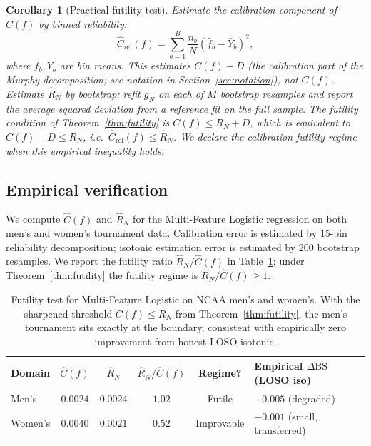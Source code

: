 \documentclass[11pt,a4paper]{article}
\newtheorem{corollary}[theorem]{Corollary}
\theoremstyle{definition}
\newcommand{\BS}{\mathrm{BS}}
\begin{document}
\begin{corollary}[Practical futility test]\label{cor:futility-test}
Estimate the calibration component of $C(f)$ by binned reliability:
\[
\hat{C}_{\text{rel}}(f) = \sum_{b=1}^{B} \frac{n_b}{N} (\bar{f}_b - \bar{Y}_b)^2,
\]
where $\bar{f}_b, \bar{Y}_b$ are bin means. This estimates $C(f) - D$ (the calibration part of the Murphy decomposition; see notation in Section~\ref{sec:notation}), not $C(f)$. Estimate $\hat{R}_N$ by bootstrap: refit $g_N$ on each of $M$ bootstrap resamples and report the average squared deviation from a reference fit on the full sample. The futility condition of Theorem~\ref{thm:futility} is $C(f) \le R_N + D$, which is equivalent to $C(f) - D \le R_N$, i.e.\ $\hat{C}_{\text{rel}}(f) \le \hat{R}_N$. We declare the calibration-futility regime when this empirical inequality holds.
\end{corollary}

\subsection{Empirical verification}\label{sec:cal-empirical}

We compute $\hat{C}(f)$ and $\hat{R}_N$ for the Multi-Feature Logistic regression on both men's and women's tournament data. Calibration error is estimated by 15-bin reliability decomposition; isotonic estimation error is estimated by 200 bootstrap resamples. We report the futility ratio $\hat{R}_N / \hat{C}(f)$ in Table~\ref{tab:futility}; under Theorem~\ref{thm:futility} the futility regime is $\hat{R}_N / \hat{C}(f) \ge 1$.

\begin{table}[h]
\centering
\caption{Futility test for Multi-Feature Logistic on NCAA men's and women's. With the sharpened threshold $C(f) \le R_N$ from Theorem~\ref{thm:futility}, the men's tournament sits exactly at the boundary, consistent with empirically zero improvement from honest LOSO isotonic.}
\label{tab:futility}
\small
\begin{tabular}{@{}lccccl@{}}
\toprule
Domain & $\hat{C}(f)$ & $\hat{R}_N$ & $\hat{R}_N / \hat{C}(f)$ & Regime? & Empirical $\Delta\BS$ (LOSO iso) \\
\midrule
Men's   & $0.0024$ & $0.0024$ & $1.02$ & Futile & $+0.005$ (degraded) \\
Women's & $0.0040$ & $0.0021$ & $0.52$ & Improvable & $-0.001$ (small, transferred) \\
\bottomrule
\end{tabular}
\end{table}
\end{document}
